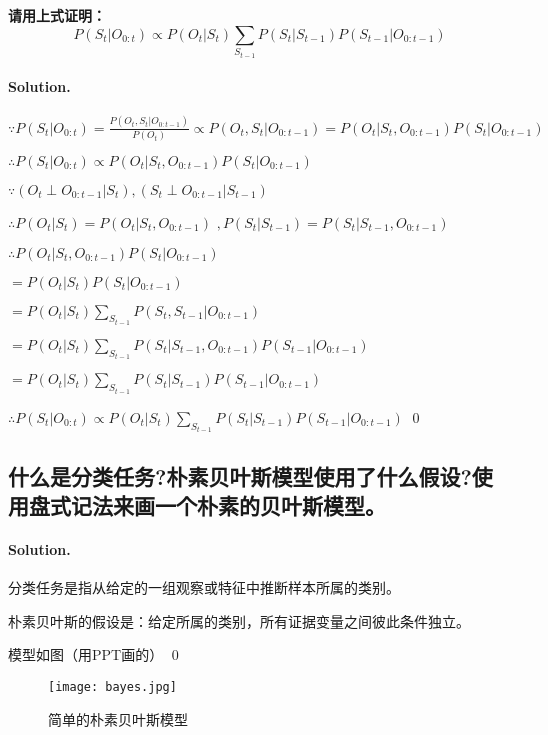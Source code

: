 \documentclass[UTF8]{ctexart}
\newenvironment{solution}
{\color{blue} \paragraph{Solution.}}
{\newline \qed}
\begin{document}
\textbf{请用上式证明：}
\begin{equation}
    P(S_t|O_{0:t})\propto P(O_t|S_t)\sum_{S_{t-1}}P(S_t|S_{t-1})P(S_{t-1}|O_{0:t-1})
\end{equation}

\begin{solution}
    
    $\because P(S_t|O_{0:t})=\frac{P(O_t,S_t|O_{0:t-1})}{P(O_t)} \propto P(O_t,S_t|O_{0:t-1})=P(O_t|S_t,O_{0:t-1})P(S_t|O_{0:t-1})$

    $\therefore P(S_t|O_{0:t})\propto P(O_t|S_t,O_{0:t-1})P(S_t|O_{0:t-1})$

    $\because (O_t\perp O_{0:t-1}|S_t),(S_t\perp O_{0:t-1}|S_{t-1})$

    $\therefore P(O_t|S_t)=P(O_t|S_t,O_{0:t-1})$
    $,P(S_t|S_{t-1})=P(S_t|S_{t-1},O_{0:t-1})$

    $\therefore P(O_t|S_t,O_{0:t-1})P(S_t|O_{0:t-1})$
    
    $=P(O_t|S_t)P(S_t|O_{0:t-1})$

    $=P(O_t|S_t)\sum\limits_{S_{t-1}}P(S_t,S_{t-1}|O_{0:t-1})$

    $=P(O_t|S_t)\sum\limits_{S_{t-1}}P(S_t|S_{t-1},O_{0:t-1})P(S_{t-1}|O_{0:t-1})$

    $=P(O_t|S_t)\sum\limits_{S_{t-1}}P(S_t|S_{t-1})P(S_{t-1}|O_{0:t-1})$

    $\therefore P(S_t|O_{0:t})\propto P(O_t|S_t)\sum_{S_{t-1}}P(S_t|S_{t-1})P(S_{t-1}|O_{0:t-1})$
\end{solution}






\subsection{什么是分类任务?朴素贝叶斯模型使用了什么假设?使用盘式记法来画一个朴素的贝叶斯模型。}
\begin{solution}
    分类任务是指从给定的一组观察或特征中推断样本所属的类别。

    朴素贝叶斯的假设是：给定所属的类别，所有证据变量之间彼此条件独立。

    模型如图（用PPT画的）
\end{solution}

\begin{figure}[ht]
    \centering
    \texttt{[image: bayes.jpg]}%
    \caption{简单的朴素贝叶斯模型}
\end{figure}
\end{document}
